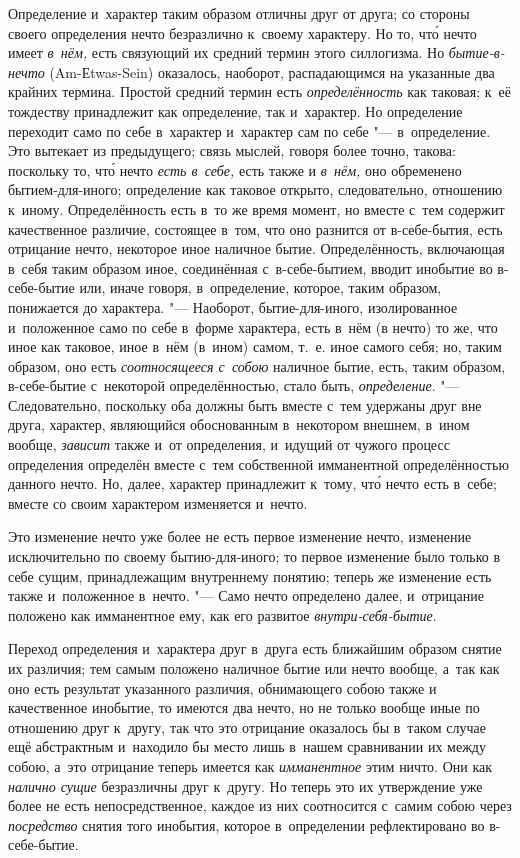Определение и~характер таким образом отличны друг от друга; со стороны
своего определения нечто безразлично к~своему характеру. Но то, чт\'{о} нечто
имеет {\em в~нём,} есть связующий их средний термин
этого силлогизма. Но {\em бытие-в-нечто}
(Am-Еtwas-Sein) оказалось, наоборот, распадающимся на указанные два крайних
термина. Простой средний термин есть
{\em определённость} как таковая; к~её тождеству
принадлежит как определение, так и~характер. Но определение переходит само
по себе в~характер и~характер сам по себе "--- в~определение. Это вытекает из
предыдущего; связь мыслей, говоря более точно, такова: поскольку то, чт\'{о}
нечто {\em есть в~себе,} есть также и
{\em в~нём,} оно обременено бытием-для-иного;
определение как таковое открыто, следовательно, отношению к~иному.
Определённость есть в~то же время момент, но вместе с~тем содержит
качественное различие, состоящее в~том, что оно разнится от в-себе-бытия,
есть отрицание нечто, некоторое иное наличное бытие. Определённость,
включающая в~себя таким образом иное, соединённая с~в-себе-бытием, вводит
инобытие во в-себе-бытие или, иначе говоря, в~определение, которое, таким
образом, понижается до характера. "--- Наоборот, бытие-для-иного,
изолированное и~положенное само по себе в~форме характера, есть в~нём (в
нечто) то же, что иное как таковое, иное в~нём (в~ином) самом, т.~е.
иное самого себя; но, таким образом, оно есть
{\em соотносящееся с~собою} наличное бытие, есть, таким
образом, в-себе-бытие с~некоторой определённостью, стало быть,
{\em определение}. "--- Следовательно, поскольку оба
должны быть вместе с~тем удержаны друг вне друга, характер, являющийся
обоснованным в~некотором внешнем, в~ином вообще,
{\em зависит} также и~от определения, и~идущий от
чужого процесс определения определён вместе с~тем собственной имманентной
определённостью данного нечто. Но, далее, характер принадлежит к~тому, чт\'{о}
нечто есть в~себе; вместе со своим характером изменяется и~нечто.

Это изменение нечто уже более не есть первое изменение нечто, изменение
исключительно по своему бытию-для-иного; то первое изменение было только
в себе сущим, принадлежащим внутреннему понятию; теперь же изменение есть
также и~положенное в~нечто. "--- Само нечто определено далее, и~отрицание
положено как имманентное ему, как его развитое
{\em внутри-себя-бытие}.

Переход определения и~характера друг в~друга есть ближайшим образом снятие
их различия; тем самым положено наличное бытие или нечто вообще, а~так как
оно есть результат указанного различия, обнимающего собою также и
качественное инобытие, то имеются два нечто, но не только вообще иные по
отношению друг к~другу, так что это отрицание оказалось бы в~таком случае
ещё абстрактным и~находило бы место лишь в~нашем сравнивании их между
собою, а~это отрицание теперь имеется как
{\em имманентное} этим ничто. Они как
{\em налично сущие} безразличны друг к~другу. Но теперь
это их утверждение уже более не есть непосредственное, каждое из них
соотносится с~самим собою через {\em посредство} снятия
того инобытия, которое в~определении рефлектировано во в-себе-бытие.

